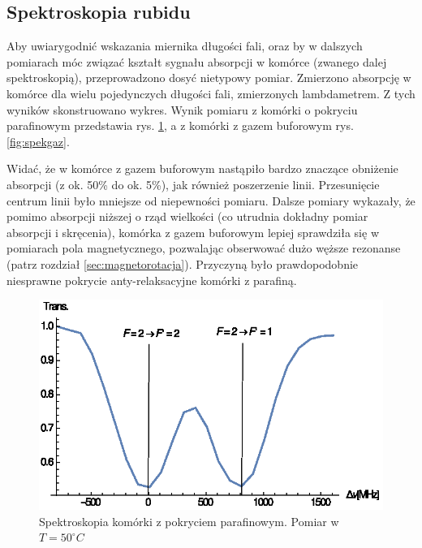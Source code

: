 \documentclass[a4paper,10pt]{article}
\begin{document}
\subsection{Spektroskopia rubidu}

Aby uwiarygodnić wskazania miernika długości fali, oraz by w dalszych pomiarach móc związać kształt sygnału absorpcji w komórce (zwanego dalej spektroskopią), przeprowadzono dosyć nietypowy pomiar.
Zmierzono absorpcję w komórce dla wielu pojedynczych długości fali, zmierzonych lambdametrem. Z tych wyników skonstruowano wykres.
Wynik pomiaru z komórki o pokryciu parafinowym przedstawia rys. \ref{fig:spekpara}, a z komórki z gazem buforowym rys. \ref{fig:spekgaz}.

Widać, że w komórce z gazem buforowym nastąpiło bardzo znaczące obniżenie absorpcji (z ok. 50\% do ok. 5\%), jak również poszerzenie linii. Przesunięcie centrum linii było mniejsze od niepewności pomiaru. Dalsze pomiary wykazały, że pomimo absorpcji niższej o rząd wielkości (co utrudnia dokładny pomiar absorpcji i skręcenia), komórka z gazem buforowym lepiej sprawdziła się w pomiarach pola magnetycznego, pozwalając obserwować dużo węższe rezonanse (patrz rozdział \ref{sec:magnetorotacja}). Przyczyną było prawdopodobnie niesprawne pokrycie anty-relaksacyjne komórki z parafiną.


\begin{figure}[h!]
\centering
 \includegraphics[width=\textwidth]{spek_para.eps}
 \caption{Spektroskopia komórki z pokryciem parafinowym. Pomiar w $T=50^{\circ}C$}
 \label{fig:spekpara}
\end{figure}
\end{document}
